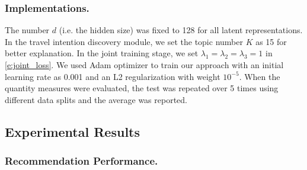\documentclass[letterpaper]{article} %
\begin{document}
\subsubsection{Implementations.}
The number $d$ (i.e. the hidden size) was fixed to 128 for all latent representations.
In the travel intention discovery module, we set the topic number $K$ as 15 for better explanation.
In the joint training stage, we set $\lambda_1=\lambda_2=\lambda_3=1$ in \cref{e:joint_loss}.
We used Adam optimizer to train our approach with an initial learning rate as 0.001 and an L2 regularization with weight $10^{-5}$.
When the quantity measures were evaluated, the test was repeated over 5 times using different data splits and the average was reported.


\subsection{Experimental Results}

\subsubsection{Recommendation Performance.}
\end{document}
